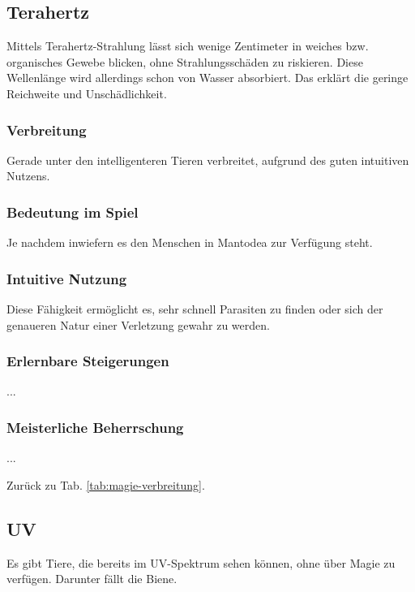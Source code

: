\subsection{Terahertz}\label{sec:terahertzmagie}
Mittels Terahertz-Strahlung lässt sich wenige Zentimeter in weiches bzw. organisches Gewebe blicken, ohne Strahlungsschäden zu riskieren.
Diese Wellenlänge wird allerdings schon von Wasser absorbiert.
Das erklärt die geringe Reichweite und Unschädlichkeit.

\subsubsection{Verbreitung}
Gerade unter den intelligenteren Tieren verbreitet, aufgrund des guten intuitiven Nutzens.

\subsubsection{Bedeutung im Spiel}
Je nachdem inwiefern es den Menschen in Mantodea zur Verfügung steht. %

\subsubsection{Intuitive Nutzung}
Diese Fähigkeit ermöglicht es, sehr schnell Parasiten zu finden oder sich der genaueren Natur einer Verletzung gewahr zu werden.

\subsubsection{Erlernbare Steigerungen}
\begin{outline}
	\1 ...
\end{outline}

\subsubsection{Meisterliche Beherrschung} 
\begin{outline}
	\1 ...
\end{outline}
Zurück zu Tab. \ref{tab:magie-verbreitung}.



\subsection{UV}\label{sec:uvmagie}
Es gibt Tiere, die bereits im UV-Spektrum sehen können, ohne über Magie zu verfügen. 
Darunter fällt die Biene.


